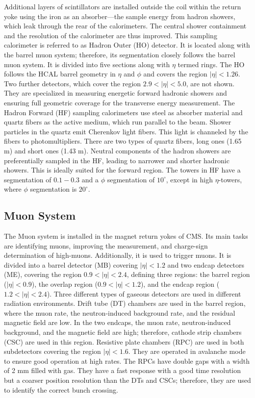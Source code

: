 Additional layers of scintillators are installed outside the coil within the return yoke using the iron as an absorber—the sample energy from hadron showers, which leak through the rear of the calorimeters. The central shower containment and the \met resolution of the calorimeter are thus improved. This sampling calorimeter is referred to as Hadron Outer (HO) detector. It is located along with the barrel muon system; therefore, its segmentation closely follows the barrel muon system. It is divided into five sections along with $\eta$ termed rings. The HO follows the HCAL barrel geometry in $\eta$ and $\phi$ and covers the region $|\eta| < 1.26$. Two further detectors, which cover the region $2.9 < |\eta| < 5.0$, are not shown. They are specialized in measuring energetic forward hadronic showers and ensuring full geometric coverage for the transverse energy measurement. The Hadron Forward (HF) sampling calorimeters use steel as absorber material and quartz fibers as the active medium, which run parallel to the beam. Shower particles in the quartz emit Cherenkov light fibers. This light is channeled by the fibers to photomultipliers. There are two types of quartz fibers, long ones (1.65 m) and short ones (1.43 m). Neutral components of the hadron showers are preferentially sampled in the HF, leading to narrower and shorter hadronic showers. This is ideally suited for the forward region. The towers in HF have a segmentation of $0.1 - 0.3$ and a $\phi$ segmentation of $10^{\circ}$, except in high $\eta$-towers, where $\phi$ segmentation is $20^{\circ}$.

\subsection{Muon System}

The Muon system is installed in the magnet return yokes of CMS. Its main tasks are identifying muons, improving the \pt measurement, and charge-sign determination of high-\pt muons. Additionally, it is used to trigger muons. It is divided into a barrel detector (MB) covering $|\eta| < 1.2$ and two endcap detectors (ME), covering the region $0.9 < |\eta| < 2.4$, defining three regions: the barrel region ($|\eta| < 0.9$), the overlap region ($0.9 < |\eta| < 1.2$), and the endcap region ($1.2 < |\eta| < 2.4$). Three different types of gaseous detectors are used in different radiation environments. Drift tube (DT) chambers are used in the barrel region, where the muon rate, the neutron-induced background rate, and the residual magnetic field are low. In the two endcaps, the muon rate, neutron-induced background, and the magnetic field are high; therefore, cathode strip chambers (CSC) are used in this region. Resistive plate chambers (RPC) are used in both subdetectors covering the region $|\eta| < 1.6$. They are operated in avalanche mode to ensure good operation at high rates. The RPCs have double gaps with a width of 2 mm filled with gas. They have a fast response with a good time resolution but a coarser position resolution than the DTs and CSCs; therefore, they are used to identify the correct bunch crossing.

